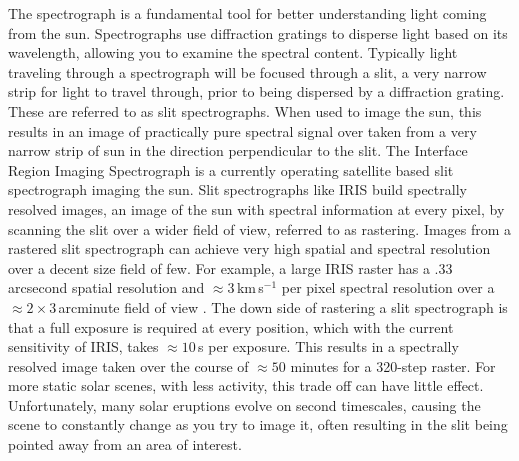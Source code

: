 The spectrograph is a fundamental tool for better understanding light coming from the sun. 
Spectrographs use diffraction gratings to disperse light based on its wavelength, allowing you to examine the spectral content.
Typically light traveling through a spectrograph will be focused through a slit, a very narrow strip for light to travel through, prior to being dispersed by a diffraction grating.
These are referred to as slit spectrographs.  
When used to image the sun, this results in an image of practically pure spectral signal over taken from a very narrow strip of sun in the direction perpendicular to the slit.
The Interface Region Imaging Spectrograph \citep[IRIS:][]{IRIS} is a currently operating satellite based slit spectrograph imaging the sun.
Slit spectrographs like IRIS build spectrally resolved images, an image of the sun with spectral information at every pixel, by scanning the slit over a wider field of view, referred to as rastering.
Images from a rastered slit spectrograph can achieve very high spatial and spectral resolution over a decent size field of few.
For example, a large IRIS raster has a .33 arcsecond spatial resolution and $\approx3$\,km\,s$^{-1}$ per pixel spectral resolution over a $\approx2\times3$\,arcminute field of view \citep{DePontieu2021}.
The down side of rastering a slit spectrograph is that a full exposure is required at every position, which with the current sensitivity of IRIS, takes $\approx10$\,s per exposure.
This results in a spectrally resolved image taken over the course of $\approx50$ minutes for a 320-step raster. 
For more static solar scenes, with less activity, this trade off can have little effect.
Unfortunately, many solar eruptions evolve on second timescales, causing the scene to constantly change as you try to image it, often resulting in the slit being pointed away from an area of interest.


